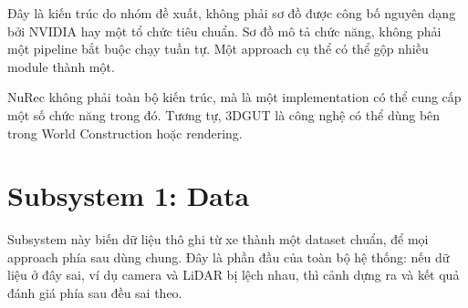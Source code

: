 Đây là kiến trúc do nhóm đề xuất, không phải sơ đồ được công bố nguyên dạng bởi NVIDIA hay một tổ chức tiêu chuẩn.
Sơ đồ mô tả chức năng, không phải một pipeline bắt buộc chạy tuần tự.
Một approach cụ thể có thể gộp nhiều module thành một.

NuRec không phải toàn bộ kiến trúc, mà là một implementation có thể cung cấp một số chức năng trong đó.
Tương tự, 3DGUT là công nghệ có thể dùng bên trong World Construction hoặc rendering.

\section{Subsystem 1: Data}

Subsystem này biến dữ liệu thô ghi từ xe thành một dataset chuẩn, để mọi approach phía sau dùng chung.
Đây là phần đầu của toàn bộ hệ thống: nếu dữ liệu ở đây sai, ví dụ camera và LiDAR bị lệch nhau, thì cảnh dựng ra và kết quả đánh giá phía sau đều sai theo.

